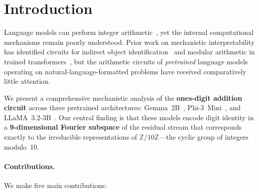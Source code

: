 \section{Introduction}
\label{sec:intro}

Language models can perform integer arithmetic~\citep{brown2020language,touvron2023llama}, yet the internal computational mechanisms remain poorly understood. Prior work on mechanistic interpretability has identified circuits for indirect object identification~\citep{wang2022interpretability} and modular arithmetic in trained transformers~\citep{nanda2023progress,zhong2024clock}, but the arithmetic circuits of \emph{pretrained} language models operating on natural-language-formatted problems have received comparatively little attention.

We present a comprehensive mechanistic analysis of the \textbf{ones-digit addition circuit} across three pretrained architectures: Gemma~2B~\citep{team2024gemma}, Phi-3~Mini~\citep{abdin2024phi3}, and LLaMA~3.2-3B~\citep{dubey2024llama}. Our central finding is that these models encode digit identity in a \textbf{9-dimensional Fourier subspace} of the residual stream that corresponds exactly to the irreducible representations of $\mathbb{Z}/10\mathbb{Z}$---the cyclic group of integers modulo~10.

\paragraph{Contributions.} We make five main contributions:

